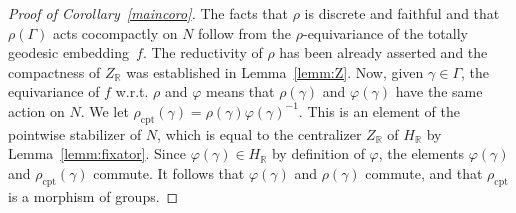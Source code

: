 \documentclass[JEP,XML,SOM,Unicode,NoFloatCountersInSection]{cedram}
\theoremstyle{plain}
\theoremstyle{definition}
\newcommand{\bR}{\mathbb{R}}
\newcommand{\rhoc}{\rho_\mathrm{cpt}}
\begin{document}
\begin{proof}[Proof of Corollary~\ref{maincoro}]
The facts that $\rho$ is discrete and
faithful and that $\rho(\Gamma)$ acts cocompactly on $N$ follow from the $\rho$-equivariance of the totally geodesic
embedding~$f$. The reductivity of $\rho$ has been already asserted and the compactness of $Z_\bR$
was established in Lemma~\ref{lemm:Z}.
Now, given $\gamma \in \Gamma$, the equivariance of $f$ w.r.t. $\rho$ and $\varphi$ means that
$\rho(\gamma)$ and $\varphi(\gamma)$ have the same action on $N$.
We let $\rhoc(\gamma)=\rho(\gamma)\varphi(\gamma)^{-1}$. This is an element of the pointwise stabilizer of $N$,
which is equal to the centralizer $Z_\bR$ of $H_\bR$ by Lemma~\ref{lemm:fixator}. Since
$\varphi(\gamma) \in H_\bR$ by definition of $\varphi$, the elements $\varphi(\gamma)$ and
$\rhoc(\gamma)$ commute.
It follows that $\varphi(\gamma)$ and $\rho(\gamma)$ commute, and that $\rhoc$ is a morphism of groups.
\end{proof}
\end{document}
